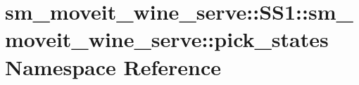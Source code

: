 \hypertarget{namespacesm__moveit__wine__serve_1_1SS1_1_1sm__moveit__wine__serve_1_1pick__states}{}\section{sm\+\_\+moveit\+\_\+wine\+\_\+serve\+:\+:S\+S1\+:\+:sm\+\_\+moveit\+\_\+wine\+\_\+serve\+:\+:pick\+\_\+states Namespace Reference}
\label{namespacesm__moveit__wine__serve_1_1SS1_1_1sm__moveit__wine__serve_1_1pick__states}
